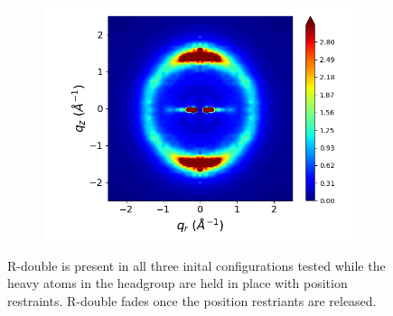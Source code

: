 \documentclass{article}
\begin{document}
\begin{figure}[htb]
\begin{subfigure}{0.3\linewidth}
  	\includegraphics[width=\textwidth]{rotated_monomers_rzplot_norestraints.png}
  	\caption{}\label{fig:rotated_monomers_rzplot_norestraints}
  \end{subfigure}
  \caption{R-double is present in all three inital configurations tested while the heavy atoms
  in the headgroup are held in place with position restraints. R-double fades once 
  the position restriants are released.}\label{fig:rdouble}
  \end{figure}
  
\end{document}
